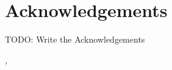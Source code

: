 \section*{Acknowledgements}

TODO: Write the Acknowledgements



\begin{comment}
\noindent \lorem

\vspace{0.3cm}
\noindent \lorem
\end{comment}

\vspace{1cm}
\noindent\textit{\UnivPlace, \Date}
\hfill \AuthorName\ \AuthorSurname
